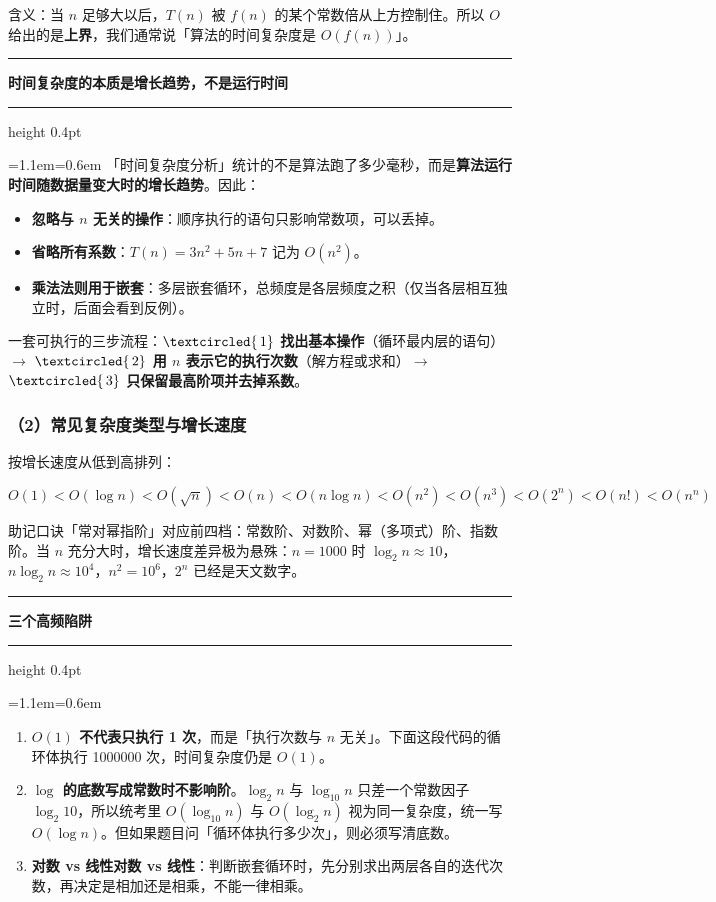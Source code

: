 \documentclass[11pt,openany,UTF8]{ctexbook}
\newcommand{\circled}[1]{\textcircled{\scriptsize\,#1}}
\newcommand{\callouthead}[2]{%
  \par\addvspace{7pt}\noindent
  {\color{#1}\rule[-0.15em]{3pt}{1.05em}}\hspace{0.5em}%
  {\bfseries\color{#1}#2}\par\nobreak\vspace{-0.35em}%
  {\color{rulesep}\hrule height 0.4pt}\nobreak\vspace{0.45em}%
  \begingroup\small\setlength{\parindent}{0pt}%
  \leftskip=1.1em\rightskip=0.6em\noindent\ignorespaces}
\newcommand{\calloutend}{\par\endgroup\addvspace{7pt}}
\newenvironment{callkey}[1]{\callouthead{keybar}{#1}}{\calloutend}
\newenvironment{callwarn}[1]{\callouthead{warnbar}{#1}}{\calloutend}
\begin{document}
含义：当 $n$ 足够大以后，$T(n)$ 被 $f(n)$ 的某个常数倍从上方控制住。所以 $O$ 给出的是\textbf{上界}，我们通常说「算法的时间复杂度是 $O(f(n))$」。

\begin{callkey}{时间复杂度的本质是增长趋势，不是运行时间}
「时间复杂度分析」统计的不是算法跑了多少毫秒，而是\textbf{算法运行时间随数据量变大时的增长趋势}。因此：

\begin{itemize}
\item \textbf{忽略与 $n$ 无关的操作}：顺序执行的语句只影响常数项，可以丢掉。
\item \textbf{省略所有系数}：$T(n)=3n^2+5n+7$ 记为 $O(n^2)$。
\item \textbf{乘法法则用于嵌套}：多层嵌套循环，总频度是各层频度之积（仅当各层相互独立时，后面会看到反例）。
\end{itemize}
一套可执行的三步流程：\textbf{$\circled{1}$ 找出基本操作}（循环最内层的语句）$\to$ \textbf{$\circled{2}$ 用 $n$ 表示它的执行次数}（解方程或求和）$\to$ \textbf{$\circled{3}$ 只保留最高阶项并去掉系数}。

\end{callkey}

\subsubsection{（2）常见复杂度类型与增长速度}

按增长速度从低到高排列：

\[O(1) < O(\log n) < O(\sqrt{n}) < O(n) < O(n\log n) < O(n^2) < O(n^3) < O(2^n) < O(n!) < O(n^n)\]

助记口诀「常对幂指阶」对应前四档：常数阶、对数阶、幂（多项式）阶、指数阶。当 $n$ 充分大时，增长速度差异极为悬殊：$n=1000$ 时 $\log_2 n \approx 10$，$n\log_2 n \approx 10^4$，$n^2 = 10^6$，$2^n$ 已经是天文数字。

\begin{callwarn}{三个高频陷阱}
\begin{enumerate}
\item \textbf{$O(1)$ 不代表只执行 1 次}，而是「执行次数与 $n$ 无关」。下面这段代码的循环体执行 1000000 次，时间复杂度仍是 $O(1)$。
\item \textbf{$\log$ 的底数写成常数时不影响阶}。$\log_2 n$ 与 $\log_{10} n$ 只差一个常数因子 $\log_2 10$，所以统考里 $O(\log_{10} n)$ 与 $O(\log_2 n)$ 视为同一复杂度，统一写 $O(\log n)$。但如果题目问「循环体执行多少次」，则必须写清底数。
\item \textbf{对数 vs 线性对数 vs 线性}：判断嵌套循环时，先分别求出两层各自的迭代次数，再决定是相加还是相乘，不能一律相乘。
\end{enumerate}
\end{callwarn}
\end{document}
